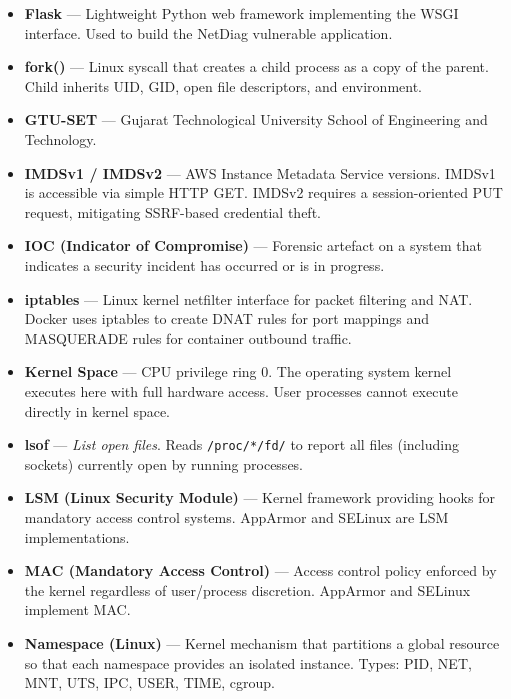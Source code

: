 \begin{itemize}
    \item \textbf{Flask} ---
    Lightweight Python web framework implementing the WSGI
    interface. Used to build the NetDiag vulnerable application.

    \item \textbf{fork()} ---
    Linux syscall that creates a child process as a copy of the
    parent. Child inherits UID, GID, open file descriptors, and
    environment.

    \item \textbf{GTU-SET} ---
    Gujarat Technological University School of Engineering and
    Technology.

    \item \textbf{IMDSv1 / IMDSv2} ---
    AWS Instance Metadata Service versions. IMDSv1 is accessible
    via simple HTTP GET. IMDSv2 requires a session-oriented PUT
    request, mitigating SSRF-based credential theft.

    \item \textbf{IOC (Indicator of Compromise)} ---
    Forensic artefact on a system that indicates a security
    incident has occurred or is in progress.

    \item \textbf{iptables} ---
    Linux kernel netfilter interface for packet filtering and
    NAT. Docker uses iptables to create DNAT rules for port
    mappings and MASQUERADE rules for container outbound traffic.

    \item \textbf{Kernel Space} ---
    CPU privilege ring 0. The operating system kernel executes
    here with full hardware access. User processes cannot execute
    directly in kernel space.

    \item \textbf{lsof} ---
    \textit{List open files}. Reads \texttt{/proc/*/fd/} to
    report all files (including sockets) currently open by
    running processes.

    \item \textbf{LSM (Linux Security Module)} ---
    Kernel framework providing hooks for mandatory access control
    systems. AppArmor and SELinux are LSM implementations.

    \item \textbf{MAC (Mandatory Access Control)} ---
    Access control policy enforced by the kernel regardless of
    user/process discretion. AppArmor and SELinux implement MAC.

    \item \textbf{Namespace (Linux)} ---
    Kernel mechanism that partitions a global resource so
    that each namespace provides an isolated instance. Types:
    PID, NET, MNT, UTS, IPC, USER, TIME, cgroup.


\end{itemize}
